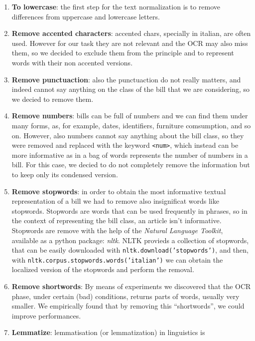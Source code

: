 \documentclass[10pt,twocolumn,letterpaper]{article}
\newcommand\codeinline[1]{\texttt{#1}}  %
\begin{document}
\begin{enumerate}
  \item \textbf{To lowercase}: the first step for the text normalization is to
    remove differences from uppercase and lowercase letters.
  \item \textbf{Remove accented characters}: accented chars, specially in
    italian, are often used. However for our task they are not relevant
    and the OCR may also miss them, so we decided to exclude them from
    the principle and to represent words with their non accented
    versions.
  \item \textbf{Remove punctuaction}: also the punctuaction do not really
    matters, and indeed cannot say anything on the class of the bill
    that we are considering, so we decied to remove them.
  \item \textbf{Remove numbers}: bills can be full of numbers and we can find
    them under many forms, as, for example, dates, identifiers,
    furniture comsumption, and so on. However, also numbers cannot say
    anything about the bill class, so they were removed and replaced
    with the keyword \codeinline{<num>}, which instead can be more
    informative as in a bag of words represents the number of numbers
    in a bill. For this case, we decied to do not completely remove
    the information but to keep only its condensed version.
  \item \textbf{Remove stopwords}: in order to obtain the most informative
    textual representation of a bill we had to remove also
    insignificat words like stopwords. Stopwords are words that can be
    used frequently in phrases, so in the context of representing the
    bill class, an article isn't informative. Stopwords are remove
    with the help of the \emph{Natural Language Toolkit}, available as
    a python package: \emph{nltk}. NLTK provieds a collection of
    stopwords, that can be easily downloaded with
    \codeinline{nltk.download('stopwords')}, and then, with
    \codeinline{nltk.corpus.stopwords.words('italian')} we can obrtain the
    localized version of the stopwords and perform the removal.
  \item \textbf{Remove shortwords}: By means of experiments we discovered that
    the OCR phase, under certain (bad) conditions, returns parts of
    words, usually very smaller. We empirically found that by removing
    this ``shortwords'', we could improve performances.
  \item \textbf{Lemmatize}: lemmatisation (or lemmatization) in linguistics is

\end{enumerate}
\end{document}
